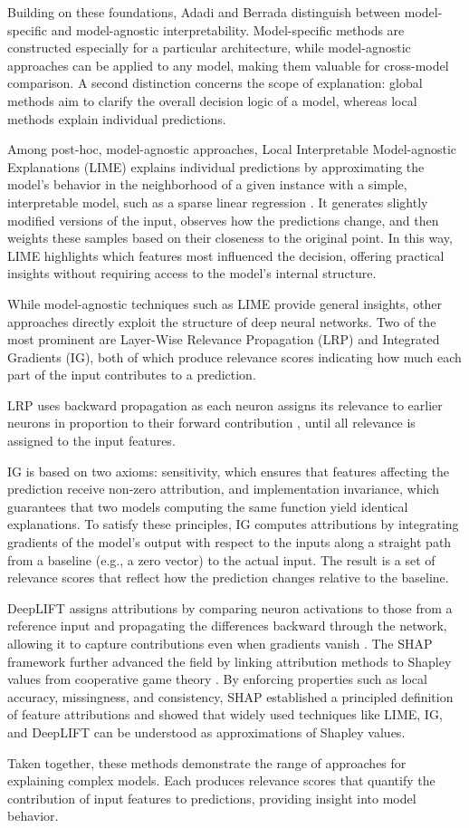 \documentclass{article}
\begin{document}
Building on these foundations, Adadi and Berrada \cite{Peeking_inside_the_black_box} distinguish between model-specific and model-agnostic interpretability. Model-specific methods are constructed especially for a particular architecture, while model-agnostic approaches can be applied to any model, making them valuable for cross-model comparison. A second distinction concerns the scope of explanation: global methods aim to clarify the overall decision logic of a model, whereas local methods explain individual predictions.

Among post-hoc, model-agnostic approaches, Local Interpretable Model-agnostic Explanations (LIME) explains individual predictions by approximating the model’s behavior in the neighborhood of a given instance with a simple, interpretable model, such as a sparse linear regression \cite{ribeiro2016lime}. It generates slightly modified versions of the input, observes how the predictions change, and then weights these samples based on their closeness to the original point. In this way, LIME highlights which features most influenced the decision, offering practical insights without requiring access to the model’s internal structure.

While model-agnostic techniques such as LIME provide general insights, other approaches directly exploit the structure of deep neural networks. Two of the most prominent are Layer-Wise Relevance Propagation (LRP) and Integrated Gradients (IG), both of which produce relevance scores indicating how much each part of the input contributes to a prediction.

LRP uses backward propagation as each neuron assigns its relevance to earlier neurons in proportion to their forward contribution \cite{bach2015lrp}, until all relevance is assigned to the input features.

IG \cite{IG_axiom} is based on two axioms: sensitivity, which ensures that features affecting the prediction receive non-zero attribution, and implementation invariance, which guarantees that two models computing the same function yield identical explanations. To satisfy these principles, IG computes attributions by integrating gradients of the model’s output with respect to the inputs along a straight path from a baseline (e.g., a zero vector) to the actual input. The result is a set of relevance scores that reflect how the prediction changes relative to the baseline.

DeepLIFT assigns attributions by comparing neuron activations to those from a reference input and propagating the differences backward through the network, allowing it to capture contributions even when gradients vanish \cite{shrikumar2017deeplift}. The SHAP framework further advanced the field by linking attribution methods to Shapley values from cooperative game theory \cite{lundberg2017shap}. By enforcing properties such as local accuracy, missingness, and consistency, SHAP established a principled definition of feature attributions and showed that widely used techniques like LIME, IG, and DeepLIFT can be understood as approximations of Shapley values.

Taken together, these methods demonstrate the range of approaches for explaining complex models. Each produces relevance scores that quantify the contribution of input features to predictions, providing insight into model behavior.
\end{document}
